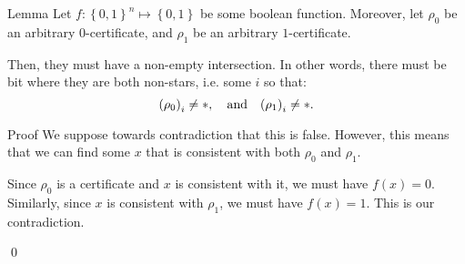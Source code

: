 \documentclass[a4paper]{article}
\begin{document}
\begin{parag}{Lemma}
    Let $f: \left\{0, 1\right\}^n \mapsto \left\{0, 1\right\}$ be some boolean function. Moreover, let $\rho_0$ be an arbitrary $0$-certificate, and $\rho_1$ be an arbitrary $1$-certificate.

    Then, they must have a non-empty intersection. In other words, there must be bit where they are both non-stars, i.e. some $i$ so that: 
    \[\left(\rho_0\right)_i \neq *, \mathspace \text{and} \mathspace \left(\rho_1\right)_i \neq *.\]

    \begin{subparag}{Proof}
        We suppose towards contradiction that this is false. However, this means that we can find some $x$ that is consistent with both $\rho_0$ and $\rho_1$.

        Since $\rho_0$ is a certificate and $x$ is consistent with it, we must have $f\left(x\right) = 0$. Similarly, since $x$ is consistent with $\rho_1$, we must have $f\left(x\right) = 1$. This is our contradiction.

        \qed
    \end{subparag}
\end{parag}
\end{document}
